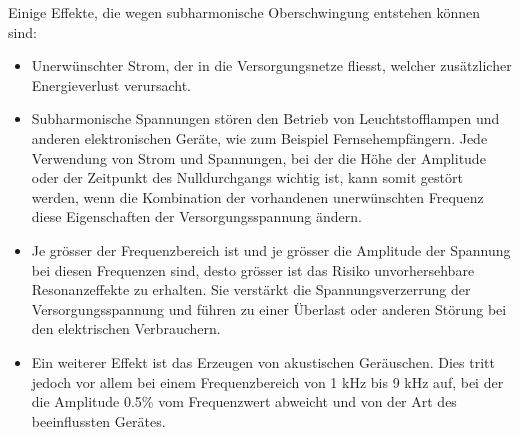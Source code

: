 Einige Effekte, die wegen subharmonische Oberschwingung entstehen können sind:
\begin{itemize}
	\item Unerwünschter Strom, der in die Versorgungsnetze fliesst, welcher zusätzlicher Energieverlust verursacht.
	\item Subharmonische Spannungen stören den Betrieb von Leuchtstofflampen und anderen elektronischen Geräte, wie zum Beispiel Fernsehempfängern. Jede Verwendung von Strom und Spannungen, bei der die Höhe der Amplitude oder der Zeitpunkt des Nulldurchgangs wichtig ist, kann somit gestört werden, wenn die Kombination der vorhandenen unerwünschten Frequenz diese Eigenschaften der Versorgungsspannung ändern.
	\item Je grösser der Frequenzbereich ist und je grösser die Amplitude der Spannung bei diesen Frequenzen sind, desto grösser ist das Risiko unvorhersehbare Resonanzeffekte zu erhalten. Sie verstärkt die Spannungsverzerrung der Versorgungsspannung und führen zu einer Überlast oder anderen Störung bei den elektrischen Verbrauchern.
	\item Ein weiterer Effekt ist das Erzeugen von akustischen Geräuschen. Dies tritt jedoch vor allem bei einem Frequenzbereich von 1 kHz bis 9 kHz auf, bei der die Amplitude 0.5\% vom Frequenzwert abweicht und von der Art des beeinflussten Gerätes.
\end{itemize}





        
